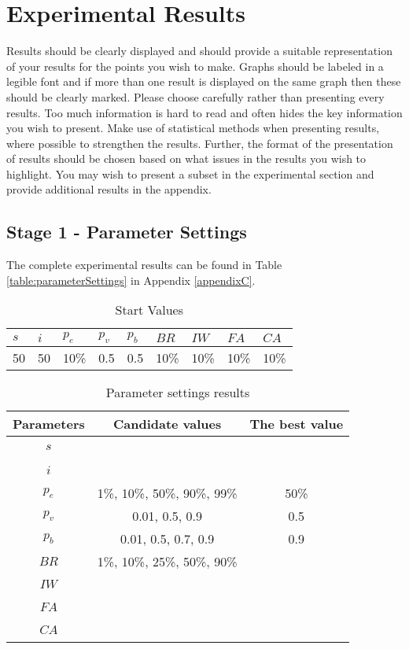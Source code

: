 \section{Experimental Results}

Results should be clearly displayed and should provide a suitable representation of your results for the points you wish to make. Graphs should be labeled in a legible font and if more than one result is displayed on the same graph then these should be clearly marked.   Please choose carefully rather than presenting every results. Too much information is hard to read and often hides the key information you wish to present. Make use of statistical methods when presenting results, where possible to strengthen the results.  Further, the format of the presentation of results should be chosen based on what issues in the results you wish to highlight. You may wish to present a subset in the experimental section and provide additional results in the appendix.

\subsection{Stage 1 - Parameter Settings}
\label{subsec:parameterSettings_results}

The complete experimental results can be found in Table \ref{table:parameterSettings} in Appendix \ref{appendixC}.

\begin{table}[H]
	\centering
    \begin{tabular}{|l|l|l|l|l|l|l|l|l|}
 	\hline
 	$s$ & $i$ & $p_{e}$ & $p_{v}$ & $p_{b}$ & $BR$  & $IW$ & $FA$ & $CA$  \\
 	\hline
    50 & 50 & 10\% & 0.5 & 0.5 & 10\% & 10\% & 10\%  & 10\%  \\
	\hline
    \end{tabular}
    \caption {Start Values}
    \label{table:parameter_startvalues}
	\end{table}

	\begin{table}[H]
	\centering
    \begin{tabular}{|c|c||c|}
 	\hline
 	Parameters & Candidate values & The best value\\
 	\hline
    $s$ & ~ & ~ \\
    $i$ & ~ & ~ \\
    $p_{e}$ & 1\%, 10\%, 50\%, 90\%, 99\% & 50\% \\
    $p_{v}$ & 0.01, 0.5, 0.9 & 0.5 \\
    $p_{b}$ & 0.01, 0.5, 0.7, 0.9 & 0.9 \\
    $BR$ & 1\%, 10\%, 25\%, 50\%, 90\% & ~ \\
    $IW$ & ~ & ~ \\
    $FA$ & ~ & ~ \\
    $CA$ & ~ & ~ \\
	\hline
    \end{tabular}
    \caption {Parameter settings results}
    \label{table:parameterSettings2}
	\end{table}

